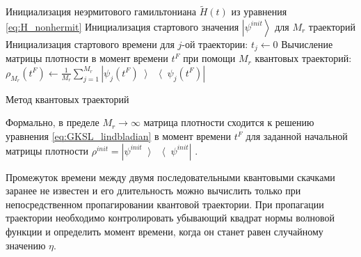\IncMargin{1em}
\begin{algorithm}
	\SetAlgoLined
	
	Инициализация неэрмитового гамильтониана \(\tilde{H}(t)\) из уравнения \cref{eq:H_nonhermit}\;
	Инициализация стартового значения \( \left| \psi^{init} \right\rangle \) для \(M_r\) траекторий\;
	{
		Инициализация стартового времени для \(j\)-ой траектории: \(t_j\leftarrow0\)\;
	}
	Вычисление матрицы плотности в момент времени \(t^F\) при помощи \(M_r\) квантовых траекторий: \(\rho_{M_r}(t^F) \leftarrow \frac{1}{M_r}\sum_{j=1}^{M_r} \left| \psi_j (t^F) \left\rangle \right\langle \psi_j (t^F)  \right| \)\;
	
	\caption{Метод квантовых траекторий}
	\label{alg:qt_main}
\end{algorithm}
\DecMargin{1em}

Формально, в пределе \(M_r \rightarrow \infty\) матрица плотности сходится к решению уравнения \cref{eq:GKSL_lindbladian} в момент времени \(t^F\) для заданной начальной матрицы плотности \( \rho^{init} = \left| \psi^{init} \left\rangle \right\langle \psi^{init} \right|\) \cite{Breuer2007, Dum1992}.

Промежуток времени между двумя последовательными квантовыми скачками заранее не известен и его длительность можно вычислить только при непосредственном пропагировании квантовой траектории. 
При пропагации траектории необходимо контролировать убывающий квадрат нормы волновой функции и определить момент времени, когда он станет равен случайному значению \(\eta\).

